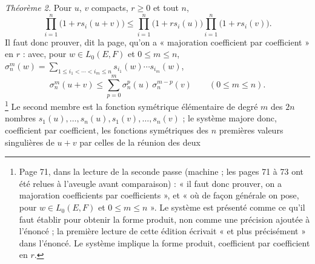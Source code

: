 \documentclass[11pt,a4paper]{article}
\begin{document}
\emph{Théorème 2.} Pour $u$, $v$ compacts, $r \geq 0$ et tout $n$,
\[
  \prod_{i=1}^{n} \bigl(1 + r s_i(u+v)\bigr) \leq
  \prod_{i=1}^{n} \bigl(1 + r s_i(u)\bigr)\prod_{i=1}^{n} \bigl(1 + r s_i(v)\bigr) .
\]
Il faut donc prouver, dit la page, qu'on a « majoration coefficient par
coefficient » en $r$ : avec, pour $w \in L_0(E,F)$ et $0 \leq m \leq n$,
$\sigma_n^m(w) = \sum_{1 \leq i_1 < \cdots < i_m \leq n} s_{i_1}(w) \cdots
s_{i_m}(w)$,
\[
  \sigma_n^m(u+v) \leq \sum_{p=0}^{m} \sigma_n^p(u)\,\sigma_n^{m-p}(v)
  \qquad (0 \leq m \leq n) .
\]
\footnote{Page 71, dans la lecture de la seconde passe (machine ; les pages
71 à 73 ont été relues à l'aveugle avant comparaison) : « il faut donc
prouver, on a majoration coefficients par coefficients », et « où de façon
générale on pose, pour $w \in L_0(E,F)$ et $0 \leq m \leq n$ ». Le système
est présenté comme ce qu'il faut établir pour obtenir la forme produit, non
comme une précision ajoutée à l'énoncé ; la première lecture de cette édition
écrivait « et plus précisément » dans l'énoncé. Le système implique la forme
produit, coefficient par coefficient en $r$.}
Le second membre est la fonction symétrique élémentaire de degré $m$ des
$2n$ nombres $s_1(u), \ldots, s_n(u), s_1(v), \ldots, s_n(v)$ ; le système
majore donc, coefficient par coefficient, les fonctions symétriques des $n$
premières valeurs singulières de $u+v$ par celles de la réunion des deux
\end{document}
